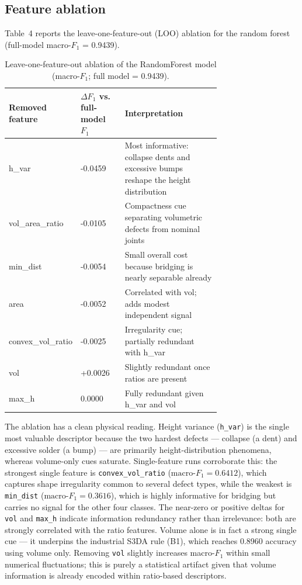 \documentclass[3p]{elsarticle}
\begin{document}
\subsection{Feature ablation}
Table~4 reports the leave-one-feature-out (LOO) ablation for the random forest (full-model macro-$F_1$ = 0.9439).
\begin{table}[htbp]
\centering
\caption{Leave-one-feature-out ablation of the RandomForest model (macro-$F_1$; full model = 0.9439).}
\begin{tabular}{lp{0.22\linewidth}p{0.50\linewidth}}
\toprule
\textbf{Removed feature} & \textbf{$\Delta F_1$ vs. full-model $F_1$} & \textbf{Interpretation} \\
\midrule
h\_var & -0.0459 & Most informative: collapse dents and excessive bumps reshape the height distribution \\
vol\_area\_ratio & -0.0105 & Compactness cue separating volumetric defects from nominal joints \\
min\_dist & -0.0054 & Small overall cost because bridging is nearly separable already \\
area & -0.0052 & Correlated with vol; adds modest independent signal \\
convex\_vol\_ratio & -0.0025 & Irregularity cue; partially redundant with h\_var \\
vol & +0.0026 & Slightly redundant once ratios are present \\
max\_h & 0.0000 & Fully redundant given h\_var and vol \\
\bottomrule
\end{tabular}
\end{table}
The ablation has a clean physical reading. Height variance (\texttt{h\_var}) is the single most valuable descriptor because the two hardest defects --- collapse (a dent) and excessive solder (a bump) --- are primarily height-distribution phenomena, whereas volume-only cues saturate. Single-feature runs corroborate this: the strongest single feature is \texttt{convex\_vol\_ratio} ($\text{macro-}F_1=0.6412$), which captures shape irregularity common to several defect types, while the weakest is \texttt{min\_dist} ($\text{macro-}F_1=0.3616$), which is highly informative for bridging but carries no signal for the other four classes. The near-zero or positive deltas for \texttt{vol} and \texttt{max\_h} indicate information redundancy rather than irrelevance: both are strongly correlated with the ratio features. Volume alone is in fact a strong single cue --- it underpins the industrial S3DA rule (B1), which reaches 0.8960 accuracy using volume only. Removing \texttt{vol} slightly increases macro-$F_1$ within small numerical fluctuations; this is purely a statistical artifact given that volume information is already encoded within ratio-based descriptors.
\end{document}
